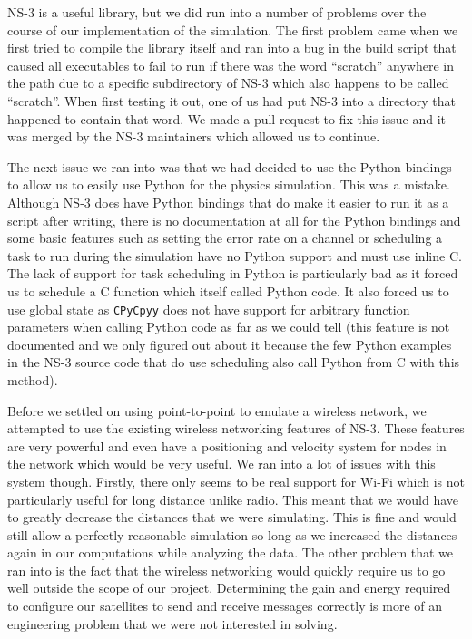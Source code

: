 \documentclass[a4paper,12pt]{article}
\newcommand{\CC}{C\nolinebreak\hspace{-.05em}\raisebox{.4ex}{\tiny\bf
    +}\nolinebreak\hspace{-.10em}\raisebox{.4ex}{\tiny\bf +}}
\def\CC{{C\nolinebreak[4]\hspace{-.05em}\raisebox{.4ex}{\tiny\bf ++}}}
\begin{document}
NS-3 is a useful library, but we did run into a number of problems over the
course of our implementation of the simulation. The first problem came when we
first tried to compile the library itself and ran into a bug in the build script
that caused all executables to fail to run if there was the word ``scratch''
anywhere in the path due to a specific subdirectory of NS-3 which also happens
to be called ``scratch''. When first testing it out, one of us had put NS-3 into
a directory that happened to contain that word. We made a pull request to fix
this issue and it was merged by the NS-3 maintainers which allowed us to
continue.

The next issue we ran into was that we had decided to use the Python bindings to
allow us to easily use Python for the physics simulation. This was a mistake.
Although NS-3 does have Python bindings that do make it easier to run it as a
script after writing, there is no documentation at all for the Python bindings
and some basic features such as setting the error rate on a channel or
scheduling a task to run during the simulation have no Python support and must
use inline \CC. The lack of support for task scheduling in Python is
particularly bad as it forced us to schedule a \CC{} function which itself
called Python code. It also forced us to use global state as \texttt{CPyCpyy}
does not have support for arbitrary function parameters when calling Python code
as far as we could tell (this feature is not documented and we only figured out
about it because the few Python examples in the NS-3 source code that do use
scheduling also call Python from \CC{} with this method).

Before we settled on using point-to-point to emulate a wireless network, we
attempted to use the existing wireless networking features of NS-3. These
features are very powerful and even have a positioning and velocity system for
nodes in the network which would be very useful. We ran into a lot of issues
with this system though. Firstly, there only seems to be real support for Wi-Fi
which is not particularly useful for long distance unlike radio. This meant that
we would have to greatly decrease the distances that we were simulating. This is
fine and would still allow a perfectly reasonable simulation so long as we
increased the distances again in our computations while analyzing the data. The
other problem that we ran into is the fact that the wireless networking would
quickly require us to go well outside the scope of our project. Determining the
gain and energy required to configure our satellites to send and receive
messages correctly is more of an engineering problem that we were not interested
in solving.
\end{document}
